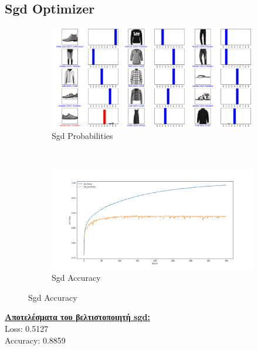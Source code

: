 \documentclass{article}
\begin{document}
\subsection*{Sgd Optimizer}
		\begin{figure}[h!]
		\centering
		\begin{subfigure}[t]{0.5\textwidth}
			\centering
			\includegraphics[width=\linewidth]{../exercise3_3/images/fashion_sgd_probabilities.png}
			\caption{Sgd Probabilities}
		\end{subfigure}%
		~
		\begin{subfigure}[t]{0.5\textwidth}
			\centering
			\includegraphics[width=\linewidth]{../exercise3_3/images/fashion_sgd_accuracy.png}
			\caption{Sgd Accuracy}
		\end{subfigure}
	\end{figure}
	\noindent
	\textbf{\underline{Aποτελέσματα του βελτιστοποιητή sgd:}}\\
	Loss: 0.5127 \\ 
	Accuracy: 0.8859
\end{document}
